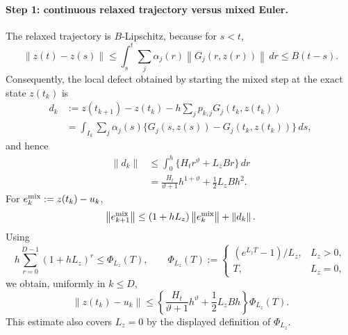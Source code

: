 \documentclass[twoside,11pt]{article}
\newcommand{\norm}[1]{\left\lVert #1\right\rVert}
\begin{document}
\paragraph{Step 1: continuous relaxed trajectory versus mixed Euler.}
The relaxed trajectory is $B$-Lipschitz, because for $s<t$,
\begin{equation}
 \norm{z(t)-z(s)}
 \le\int_s^t\sum_j\alpha_j(r)\norm{G_j(r,z(r))}\,dr
 \le B(t-s).
 \label{eq:app-holder-path-speed}
\end{equation}
Consequently, the local defect obtained by starting the mixed step at the
exact state $z(t_k)$ is
\begin{align}
 d_k
 &:={z(t_{k+1})-z(t_k)}
    -h\sum_jp_{k,j}G_j(t_k,z(t_k))\nonumber\\
 &=\int_{I_k}\sum_j\alpha_j(s)
   \{G_j(s,z(s))-G_j(t_k,z(t_k))\}\,ds,
 \label{eq:app-holder-local-defect}
\end{align}
and hence
\begin{align}
 \norm{d_k}
 &\le\int_0^h\{H_tr^\vartheta+L_zBr\}\,dr\nonumber\\
 &=\frac{H_t}{\vartheta+1}h^{1+\vartheta}
   +\frac12L_zBh^2.
 \label{eq:app-holder-local-bound}
\end{align}
For $e_k^{\rm mix}:=z(t_k)-u_k$,
\begin{equation}
 \norm{e_{k+1}^{\rm mix}}
 \le(1+hL_z)\norm{e_k^{\rm mix}}+\norm{d_k}.
 \label{eq:app-holder-mixed-recursion}
\end{equation}
Using
\begin{equation}
 h\sum_{r=0}^{D-1}(1+hL_z)^r
 \le \Phi_{L_z}(T),
 \qquad
 \Phi_{L_z}(T):=
 \begin{cases}
  (e^{L_zT}-1)/L_z,&L_z>0,\\
  T,&L_z=0,
 \end{cases}
 \label{eq:app-holder-phi}
\end{equation}
we obtain, uniformly in $k\le D$,
\begin{equation}
 \norm{z(t_k)-u_k}
 \le
 \left\{\frac{H_t}{\vartheta+1}h^\vartheta
       +\frac12L_zBh\right\}\Phi_{L_z}(T).
 \label{eq:app-holder-cont-mixed}
\end{equation}
This estimate also covers $L_z=0$ by the displayed definition of
$\Phi_{L_z}$.
\end{document}
